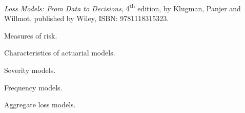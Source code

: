 \documentclass{osucourse}
\begin{document}
\CatalogDescription
\PrerequisitesAndExclusions

\begin{Text}
\emph{Loss Models: From Data to Decisions}, 4\textsuperscript{th} edition, by Klugman, Panjer and Willmot, published by Wiley, ISBN: 9781118315323.
\end{Text}

\begin{TopicsList}
\item Measures of risk.
\item Characteristics of actuarial models.
\item Severity models.
\item Frequency models.
\item Aggregate loss models.
\end{TopicsList}
\end{document}
